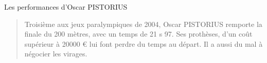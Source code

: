 \begin{doc}
	\caption{Les performances d'Oscar PISTORIUS}
	\label{doc:perfs}
	
	
		\begin{quotation}
			Troisième aux jeux paralympiques de 2004, Oscar PISTORIUS remporte la finale du 200 mètres, avec un temps de 21 s 97. Ses prothèses, d'un coût supérieur à \num{20000} € lui font perdre du temps au départ. Il a aussi du mal à négocier les virages.
		\end{quotation}
\end{doc} 